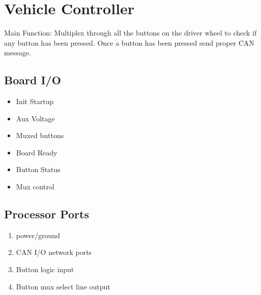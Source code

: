 \documentclass[letterpaper,12pt]{article}
\begin{document}
\pagebreak
\section{Vehicle Controller}
Main Function: Multiplex through all the buttons on the driver wheel to check if any button has been pressed. Once a button has been pressed send proper CAN message.
   \subsection{Board I/O}
   \begin{multicols}{2}
   
   \begin{itemize}
      \item Init Startup
   \end{itemize}
   
   \begin{itemize}
      \item Aux Voltage
      \item Muxed buttons
   \end{itemize}
   
   \columnbreak
   

   \begin{itemize}
      \item Board Ready
      \item Button Status
   \end{itemize}
   
   \begin{itemize}
      \item Mux control
   \end{itemize}
   \end{multicols}

   \subsection{Processor Ports}
   \begin{multicols}{2}
   \begin{enumerate}[(a.)]
      \item power/ground
      \item CAN I/O network ports
      \item Button logic input

      \item Button mux select line output
   \end{enumerate}
   \end{multicols}
\end{document}
